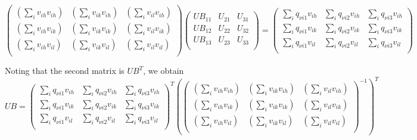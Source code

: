 \documentclass[prb]{revtex4}%
\begin{document}
\begin{equation}\label{UBintermediarystep}
    \left(
      \begin{array}{ccc}
        \left(\sum_{i} v_{ih}v_{ih}\right) & \left(\sum_{i} v_{ik}v_{ih}\right) & \left(\sum_{i} v_{il}v_{ih}\right) \\
        \left(\sum_{i} v_{ih}v_{ik}\right) & \left(\sum_{i} v_{ik}v_{ik}\right) & \left(\sum_{i} v_{il}v_{ik}\right) \\
        \left(\sum_{i} v_{ih}v_{il}\right) & \left(\sum_{i} v_{ik}v_{il}\right) & \left(\sum_{i} v_{il}v_{il}\right) \\
      \end{array}
    \right)
    \left(
      \begin{array}{ccc}
        UB_{11} & U_{21} & U_{31} \\
        UB_{12} & U_{22} & U_{32}\\
        UB_{13} & U_{23} & U_{33}\\
      \end{array}
    \right)
    =\left(
       \begin{array}{ccc}
         \sum_{i} q_{\nu i 1} v_{ih} & \sum_{i} q_{\nu i 2} v_{ih} &\sum_{i} q_{\nu i 3} v_{ih} \\
         \sum_{i} q_{\nu i 1} v_{ik} & \sum_{i} q_{\nu i 2} v_{ik} &\sum_{i} q_{\nu i 3} v_{ik}\\
         \sum_{i} q_{\nu i 1} v_{il} & \sum_{i} q_{\nu i 2} v_{il} &\sum_{i} q_{\nu i 3} v_{il}\\
       \end{array}
     \right)
\end{equation}

Noting that the second matrix is $UB^T$, we obtain
\begin{equation}
   UB=
    \left(
       \begin{array}{ccc}
         \sum_{i} q_{\nu i 1} v_{ih} & \sum_{i} q_{\nu i 2} v_{ih} &\sum_{i} q_{\nu i 3} v_{ih} \\
         \sum_{i} q_{\nu i 1} v_{ik} & \sum_{i} q_{\nu i 2} v_{ik} &\sum_{i} q_{\nu i 3} v_{ik}\\
         \sum_{i} q_{\nu i 1} v_{il} & \sum_{i} q_{\nu i 2} v_{il} &\sum_{i} q_{\nu i 3} v_{il}\\
       \end{array}
     \right)^T\left(\left(
      \begin{array}{ccc}
        \left(\sum_{i} v_{ih}v_{ih}\right) & \left(\sum_{i} v_{ik}v_{ih}\right) & \left(\sum_{i} v_{il}v_{ih}\right) \\
        \left(\sum_{i} v_{ih}v_{ik}\right) & \left(\sum_{i} v_{ik}v_{ik}\right) & \left(\sum_{i} v_{il}v_{ik}\right) \\
        \left(\sum_{i} v_{ih}v_{il}\right) & \left(\sum_{i} v_{ik}v_{il}\right) & \left(\sum_{i} v_{il}v_{il}\right) \\
      \end{array}
    \right)^{-1}\right)^T
\end{equation}
\end{document}
